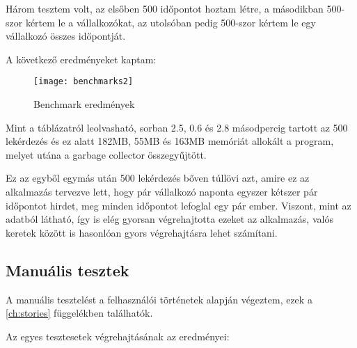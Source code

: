 Három tesztem volt, az elsőben 500 időpontot hoztam létre, a másodikban 500-szor kértem le a vállalkozókat, az utolsóban pedig 500-szor kértem le egy vállalkozó összes időpontját.

A következő eredményeket kaptam:

\begin{figure}[H]
	\centering
	\texttt{[image: benchmarks2]}
	\caption{Benchmark eredmények}
\end{figure}

Mint a táblázatról leolvasható, sorban 2.5, 0.6 és 2.8 másodpercig tartott az 500 lekérdezés és ez alatt 182MB, 55MB és 163MB memóriát allokált a program, melyet utána a garbage collector összegyűjtött.

Ez az egyből egymás után 500 lekérdezés bőven túllövi azt, amire ez az alkalmazás tervezve lett, hogy pár vállalkozó naponta egyszer kétszer pár időpontot hirdet, meg minden időpontot lefoglal egy pár ember. Viszont, mint az adatból látható, így is elég gyorsan végrehajtotta ezeket az alkalmazás, valós keretek között is hasonlóan gyors végrehajtásra lehet számítani.

\clearpage

\subsection{Manuális tesztek}

A manuális tesztelést a felhasználói történetek alapján végeztem, ezek a \ref{ch:stories} függelékben találhatók.

Az egyes tesztesetek végrehajtásának az eredményei:


